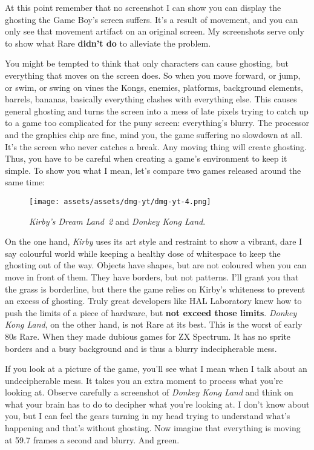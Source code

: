 \documentclass{book}
\begin{document}
At this point remember that no screenshot I can show you can display the ghosting the Game Boy’s screen suffers. It’s a result of movement, and you can only see that movement artifact on an original screen. My screenshots serve only to show what Rare \textbf{didn’t do} to alleviate the problem.

You might be tempted to think that only characters can cause ghosting, but everything that moves on the screen does. So when you move forward, or jump, or swim, or swing on vines the Kongs, enemies, platforms, background elements, barrels, bananas, basically everything clashes with everything else. This causes general ghosting and turns the screen into a mess of late pixels trying to catch up to a game too complicated for the puny screen: everything’s blurry. The processor and the graphics chip are fine, mind you, the game suffering no slowdown at all. It’s the screen who never catches a break. Any moving thing will create ghosting. Thus, you have to be careful when creating a game’s environment to keep it simple. To show you what I mean, let’s compare two games released around the same time:

\begin{figure}[hbt]
\vskip 10pt
\centering \texttt{[image: assets/assets/dmg-yt/dmg-yt-4.png]}\par\pagetwodescription \emph{Kirby’s Dream Land 2} and \emph{Donkey Kong Land}.
\vskip 6pt
\end{figure}

On the one hand, \emph{Kirby} uses its art style and restraint to show a vibrant, dare I say colourful world while keeping a healthy dose of whitespace to keep the ghosting out of the way. Objects have shapes, but are not coloured when you can move in front of them. They have borders, but not patterns. I’ll grant you that the grass is borderline, but there the game relies on Kirby’s whiteness to prevent an excess of ghosting. Truly great developers like HAL Laboratory knew how to push the limits of a piece of hardware, but \textbf{not exceed those limits}. \emph{Donkey Kong Land}, on the other hand, is not Rare at its best. This is the worst of early 80s Rare. When they made dubious games for ZX Spectrum. It has no sprite borders and a busy background and is thus a blurry indecipherable mess.

If you look at a picture of the game, you’ll see what I mean when I talk about an undecipherable mess. It takes you an extra moment to process what you’re looking at. Observe carefully a screenshot of \emph{Donkey Kong Land} and think on what your brain has to do to decipher what you’re looking at. I don’t know about you, but I can feel the gears turning in my head trying to understand what’s happening and that’s without ghosting. Now imagine that everything is moving at 59.7 frames a second and blurry. And green.
\end{document}
